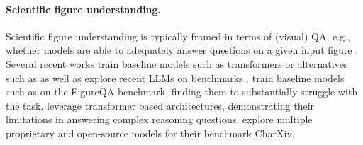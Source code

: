 \paragraph{Scientific figure understanding.} Scientific figure understanding is typically framed in terms of (visual) QA, e.g., whether models are able to adequately answer questions on a given input figure \cite{10.1007/978-3-319-46493-0_15}. %
Several recent works train baseline models such as transformers \cite{masry-etal-2022-chartqa} or alternatives \cite{ebrahimi2018figureqa} such as \cite{NIPS2017_e6acf4b0} as well as explore recent LLMs on benchmarks \cite{wang2024charxiv,li-etal-2024-multimodal-arxiv}. 
%
\iffalse 
\citet{ebrahimi2018figureqa} %
train 
baseline models such as \cite{NIPS2017_e6acf4b0} on the FigureQA benchmark, finding them to substantially struggle with the task. %
\citet{masry-etal-2022-chartqa} %
leverage transformer based architectures, demonstrating their limitations in answering complex reasoning questions.
\citet{wang2024charxiv} explore multiple proprietary and open-source models for their benchmark %
CharXiv. %
